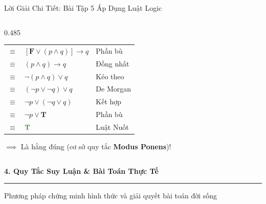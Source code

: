 \documentclass[aspectratio=169, 10pt]{beamer}
\begin{document}
\begin{frame}{Lời Giải Chi Tiết: Bài Tập 5 Áp Dụng Luật Logic}
\begin{columns}[t, onlytextwidth]
\begin{column}{0.485\textwidth}
\begin{cozyExample}
\begin{tabular}{cll}
          $\equiv$ & $[\mathbf{F} \lor (p \land q)] \to q$ & Phần bù \\
          $\equiv$ & $(p \land q) \to q$ & Đồng nhất \\
          $\equiv$ & $\neg(p \land q) \lor q$ & Kéo theo \\
          $\equiv$ & $(\neg p \lor \neg q) \lor q$ & De Morgan \\
          $\equiv$ & $\neg p \lor (\neg q \lor q)$ & Kết hợp \\
          $\equiv$ & $\neg p \lor \mathbf{T}$ & Phần bù \\
          $\equiv$ & $\mathbf{\textcolor{cozyTrue}{T}}$ & Luật Nuốt \\
          \bottomrule
        \end{tabular}
        \vspace{0.03cm}
        \par\centering\tiny\color{cozySlate}$\implies$ Là hằng đúng (cơ sở quy tắc \textbf{Modus Ponens})!
      \end{cozyExample}
    \end{column}
  \end{columns}
\end{frame}


\begin{frame}[plain]
  \centering
  \vspace*{2.0cm}
  {\LARGE\textbf{\color{cozySlate}4. Quy Tắc Suy Luận \& Bài Toán Thực Tế}}
  \par\vspace{0.4cm}
  {\color{cozyWarm}\rule{0.6\textwidth}{1.5pt}}
  \par\vspace{0.3cm}
  {\normalsize\color{cozyMuted}Phương pháp chứng minh hình thức và giải quyết bài toán đời sống}
\end{frame}
\end{document}
